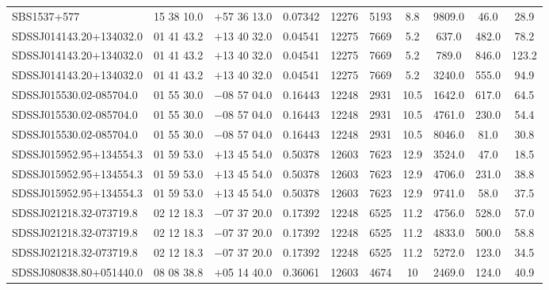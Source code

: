 \begin{landscape}
\begin{center}
\begin{longtable}{l c c c c c c c c c}
SBS1537+577  &             15 38 10.0  &         $+$57 36 13.0  &       0.07342  & 12276  &   5193  &       8.8  &       9809.0  &  46.0  &   28.9  \\
SDSSJ014143.20+134032.0  & 01 41 43.2  &         $+$13 40 32.0  &       0.04541  & 12275  &   7669  &       5.2  &       637.0  &   482.0  &  78.2  \\
SDSSJ014143.20+134032.0  & 01 41 43.2  &         $+$13 40 32.0  &       0.04541  & 12275  &   7669  &       5.2  &       789.0  &   846.0  &  123.2  \\
SDSSJ014143.20+134032.0  & 01 41 43.2  &         $+$13 40 32.0  &       0.04541  & 12275  &   7669  &       5.2  &       3240.0  &  555.0  &  94.9  \\
SDSSJ015530.02-085704.0  & 01 55 30.0  &         $-$08 57 04.0  &       0.16443  & 12248  &   2931  &       10.5  &      1642.0  &  617.0  &  64.5  \\
SDSSJ015530.02-085704.0  & 01 55 30.0  &         $-$08 57 04.0  &       0.16443  & 12248  &   2931  &       10.5  &      4761.0  &  230.0  &  54.4  \\
SDSSJ015530.02-085704.0  & 01 55 30.0  &         $-$08 57 04.0  &       0.16443  & 12248  &   2931  &       10.5  &      8046.0  &  81.0  &   30.8  \\
SDSSJ015952.95+134554.3  & 01 59 53.0  &         $+$13 45 54.0  &       0.50378  & 12603  &   7623  &       12.9  &      3524.0  &  47.0  &   18.5  \\
SDSSJ015952.95+134554.3  & 01 59 53.0  &         $+$13 45 54.0  &       0.50378  & 12603  &   7623  &       12.9  &      4706.0  &  231.0  &  38.8  \\
SDSSJ015952.95+134554.3  & 01 59 53.0  &         $+$13 45 54.0  &       0.50378  & 12603  &   7623  &       12.9  &      9741.0  &  58.0  &   37.5  \\
SDSSJ021218.32-073719.8  & 02 12 18.3  &         $-$07 37 20.0  &       0.17392  & 12248  &   6525  &       11.2  &      4756.0  &  528.0  &  57.0  \\
SDSSJ021218.32-073719.8  & 02 12 18.3  &         $-$07 37 20.0  &       0.17392  & 12248  &   6525  &       11.2  &      4833.0  &  500.0  &  58.8  \\
SDSSJ021218.32-073719.8  & 02 12 18.3  &         $-$07 37 20.0  &       0.17392  & 12248  &   6525  &       11.2  &      5272.0  &  123.0  &  34.5  \\
SDSSJ080838.80+051440.0  & 08 08 38.8  &         $+$05 14 40.0  &       0.36061  & 12603  &   4674  &       10  &        2469.0  &  124.0  &  40.9  \\

\end{longtable}
\end{center}
\end{landscape}

